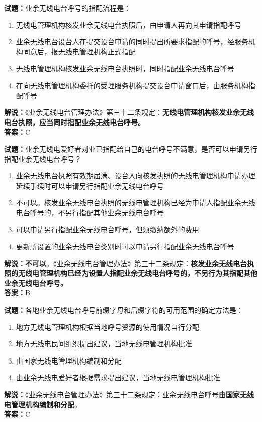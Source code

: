 \documentclass{ctexbook}
\begin{document}
\textbf{试题：}业余无线电台呼号的指配流程是：
\begin{enumerate}[leftmargin=3em]
  \item 无线电管理机构核发业余无线电台执照后，由申请人再向其申请指配呼号
  \item 业余无线电台设台人在提交设台申请的同时提出所要求指配的呼号，经服务机构同意后，报无线电管理机构正式指配
  \item 无线电管理机构核发业余无线电台执照时，同时指配业余无线电台呼号
  \item 在向无线电管理机构委托的受理服务机构提交设台申请窗口后，由服务机构指配呼号
\end{enumerate}
\noindent\textbf{解说：}《业余无线电台管理办法》第三十二条规定：\textbf{无线电管理机构核发业余无线电台执照，应当同时指配业余无线电台呼号。}\\\noindent\textbf{答案：}C

\vspace{1em}

\textbf{试题：}业余无线电爱好者对业已指配给自己的电台呼号不满意，是否可以申请另行指配业余无线电台呼号？
\begin{enumerate}[leftmargin=3em]
  \item 业余无线电台执照有效期届满、设台人向核发执照的无线电管理机构申请办理延续手续时可以申请另行指配业余无线电台呼号
  \item 不可以。核发业余无线电台执照的无线电管理机构已经为申请人指配业余无线电台呼号的，不另行指配其他业余无线电台呼号
  \item 可以申请另行指配业余无线电台呼号，但须缴纳额外的费用
  \item 更新所设置的业余无线电台类别时可以申请另行指配业余无线电台呼号
\end{enumerate}
\textbf{解说：不可以}。《业余无线电台管理办法》第三十二条规定：\textbf{核发业余无线电台执照的无线电管理机构已经为设置人指配业余无线电台呼号的，不另行为其指配其他业余无线电台呼号。}\\\noindent\textbf{答案：}B

\vspace{1em}

\textbf{试题：}各地业余无线电台呼号前缀字母和后缀字符的可用范围的确定方法是：
\begin{enumerate}[leftmargin=3em]
  \item 地方无线电管理机构根据当地呼号资源的使用情况自行分配
  \item 地方无线电民间组织提出建议，当地无线电管理机构批准
  \item 由国家无线电管理机构编制和分配
  \item 由业余无线电爱好者根据需求提出建议，当地无线电管理机构批准
\end{enumerate}
\noindent\textbf{解说：}《业余无线电台管理办法》第三十二条规定：业余无线电台呼号\textbf{由国家无线电管理机构编制和分配}。\\\noindent\textbf{答案：}C
\end{document}
